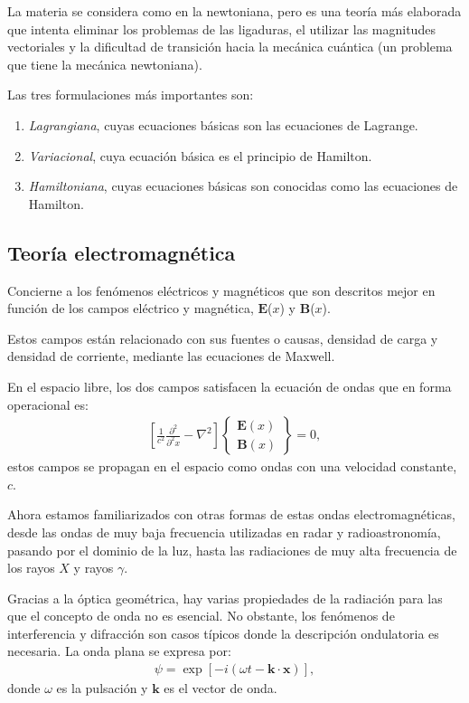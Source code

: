 \documentclass[../main]{subfiles}
\begin{document}
La materia se considera como en la newtoniana, pero es una teoría más elaborada que intenta eliminar los problemas de las ligaduras, el utilizar las magnitudes vectoriales y la dificultad de transición hacia la mecánica cuántica (un problema que tiene la mecánica newtoniana).

Las tres formulaciones más importantes son:

\begin{enumerate}
    \item \textit{Lagrangiana}, cuyas ecuaciones básicas son las ecuaciones de Lagrange.
    \item \textit{Variacional}, cuya ecuación básica es el principio de Hamilton.
    \item \textit{Hamiltoniana}, cuyas ecuaciones básicas son conocidas como las ecuaciones de Hamilton.
\end{enumerate}

\subsection{Teoría electromagnética}

Concierne a los fenómenos eléctricos y magnéticos que son descritos mejor en función de los campos eléctrico y magnética, $\boldsymbol{E}$($x$) y $\boldsymbol{B}$($x$).

Estos campos están relacionado con sus fuentes o causas, densidad de carga y densidad de corriente, mediante las ecuaciones de Maxwell.

En el espacio libre, los dos campos satisfacen la ecuación de ondas que en forma operacional es:
\begin{align}
    \left[\frac{1}{c^2}\frac{\partial^2}{\partial^2 x}-\nabla^2\right] \begin{Bmatrix}
\boldsymbol{E}(x)\\
\boldsymbol{B}(x)
\end{Bmatrix}=0,
\end{align}
estos campos se propagan en el espacio como ondas con una velocidad constante, $c$.

Ahora estamos familiarizados con otras formas de estas ondas electromagnéticas, desde las ondas de muy baja frecuencia utilizadas en radar y radioastronomía, pasando por el dominio de la luz, hasta las radiaciones de muy alta frecuencia de los rayos $X$ y rayos $\gamma$.

Gracias a la óptica geométrica, hay varias propiedades de la radiación para las que el concepto de onda no es esencial. No obstante, los fenómenos de interferencia y difracción son casos típicos donde la descripción ondulatoria es necesaria. La onda plana se expresa por:
\begin{align}
    \psi=\exp[-i(\omega t-\boldsymbol{k} \cdot \boldsymbol{x})],
\end{align}
donde $\omega$ es la pulsación y $\boldsymbol{k}$ es el vector de onda.
\end{document}
